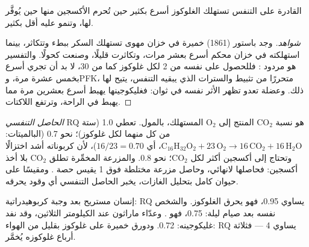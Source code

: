 \begin{proposition}\label{prop:b1:respiration-fermentation:pasteur}
 القادرة على التنفس تستهلك الغلوكوز أسرع بكثير حين تُحرم
الأكسجين منها حين يُوفَّر لها، وتنمو عليه أقل بكثير.
\end{proposition}
\begin{proof}[شواهد]
وجد باستور (1861) خميرة في خزان مهوى تستهلك السكر ببطء وتتكاثر،
بينما استهلكته في خزان محكم أسرع بعشر مرات، وتكاثرت قليلًا، وصنعت
كحولًا. والتفسير هو مردود : فللحصول على  نفسه من 2 لكل غلوكوز
كما من 30، لا بد  أن تجري  أسرع بخمس عشرة مرة،
وPFK، متحررًا من تثبيط  والسترات الذي يبقيه التنفس، يتيح لها ذلك.
وعضلة تعدو تظهر الأثر نفسه في ثوان: فغليكوجينها يهبط أسرع بعشرين مرة
مما يهبط في الراحة، وترتفع اللاكتات.
\end{proof}

\begin{definition}\label{def:b1:respiration-fermentation:rq}
\emph{الحاصل التنفسي} RQ هو نسبة $\mathrm{CO_2}$ المنتج إلى
$\mathrm{O_2}$ المستهلك، بالمول.  تعطي 1.0 (ستة من كل
منهما لكل غلوكوز)؛  نحو 0.7 (البالميتات:
$\mathrm{C_{16}H_{32}O_2} + 23\,\mathrm{O_2} \to 16\,\mathrm{CO_2} +
16\,\mathrm{H_2O}$، أي $16/23 = 0.70$)، لأن كربوناته أشد اختزالًا
وتحتاج إلى أكسجين أكثر لكل $\mathrm{CO_2}$؛  نحو 0.8.
والمزرعة المخمِّرة تطلق $\mathrm{CO_2}$ بلا أخذ أكسجين: فحاصلها
لانهائي، وحاصل مزرعة مختلطة فوق 1 يقيس حصة . ومقيسًا على حيوان
كامل بتحليل الغازات، يخبر الحاصل التنفسي أي وقود يحرقه.
\end{definition}

\begin{example}\label{ex:b1:respiration-fermentation:readrq}
إنسان مستريح بعد وجبة كربوهيدراتية: RQ يساوي 0.95، فهو يحرق الغلوكوز.
والشخص نفسه بعد صيام ليلة: 0.75، فهو . وعدّاء ماراثون عند
الكيلومتر الثلاثين، وقد نفد غليكوجينه: 0.72. ودورق خميرة على غلوكوز
بقليل من الهواء: RQ يساوي 4 --- فثلاثة أرباع غلوكوزه يُخمَّر.
\end{example}

